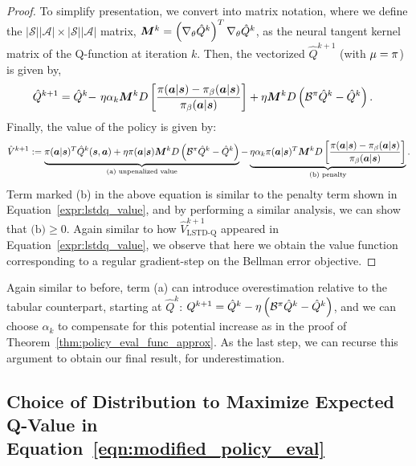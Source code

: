 \begin{proof}
To simplify presentation, we convert into matrix notation, where we define the $|\mathcal{S}||\mathcal{A}| \times |\mathcal{S}||\mathcal{A}|$ matrix, $\boldsymbol{M}^k = \left(\nabla_\theta \hat{Q}^k\right)^T \nabla_\theta \hat{Q}^k$, as the neural tangent kernel matrix of the Q-function at iteration $k$. Then, the vectorized $\hat{Q}^{k+1}$ (with $\mu = \pi$) is given by,
\begin{align*}
    \hat{Q}^{k+1} = \hat{Q}^{k} -&~ \eta \alpha_k \boldsymbol{M}^k D \left[ \frac{\pi(\boldsymbol{a}|\boldsymbol{s}) - {\pi_\beta}(\boldsymbol{a}|\boldsymbol{s})}{{\pi_\beta}(\boldsymbol{a}|\boldsymbol{s})} \right] + \eta \boldsymbol{M}^k D \left(\mathcal{B}^\pi \hat{Q}^k - \hat{Q}^k \right).
\end{align*}
Finally, the value of the policy is given by:
\begin{equation}
    \hat{V}^{k+1} := \underbrace{\pi(\boldsymbol{a}|\boldsymbol{s})^T \hat{Q}^k(\boldsymbol{s}, \boldsymbol{a}) + \eta \pi(\boldsymbol{a}|\boldsymbol{s}) \boldsymbol{M}^k D \left(\mathcal{B}^\pi \hat{Q}^k - \hat{Q}^k \right)}_{\text{(a) unpenalized value}} - \underbrace{\eta \alpha_k \pi(\boldsymbol{a}|\boldsymbol{s})^T \boldsymbol{M}^k D \left[ \frac{\pi(\boldsymbol{a}|\boldsymbol{s}) - {\pi_\beta}(\boldsymbol{a}|\boldsymbol{s})}{{\pi_\beta}(\boldsymbol{a}|\boldsymbol{s})} \right]}_{\text{(b) penalty}}.
\end{equation}
Term marked (b) in the above equation is similar to the penalty term shown in Equation~\ref{expr:lstdq_value}, and by performing a similar analysis, we can show that $\text{(b)} \geq 0$. Again similar to how $\hat{V}^{k+1}_\text{LSTD-Q}$ appeared in Equation~\ref{expr:lstdq_value}, we observe that here we obtain the value function corresponding to a regular gradient-step on the Bellman error objective. 
\end{proof}

Again similar to before, term (a) can introduce overestimation relative to the tabular counterpart, starting at $\hat{Q}^k$: $Q^{k+1} = \hat{Q}^k - \eta \left(\mathcal{B}^\pi \hat{Q}^k - \hat{Q}^k \right)$, and we can choose $\alpha_k$ to compensate for this potential increase as in the proof of Theorem~\ref{thm:policy_eval_func_approx}. As the last step, we can recurse this argument to obtain our final result, for underestimation.


\subsection{Choice of Distribution to Maximize Expected Q-Value in Equation~\ref{eqn:modified_policy_eval}}
\label{app:maximizing_distributions}

